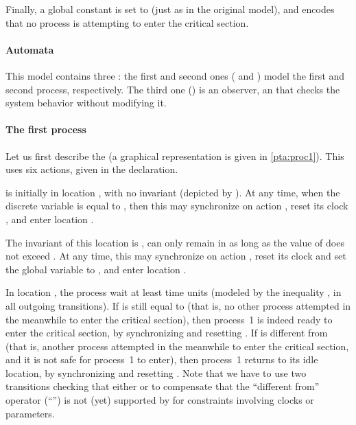 Finally, a global constant  is set to  (just as in the original \pat{} model), and encodes that no process is attempting to enter the critical section.





\paragraph{Automata}
This model contains three \IPTA{}:
the first and second ones ( and ) model the first and second process, respectively. The third one () is an observer, \ie{} an \IPTA{} that checks the system behavior without modifying it.

\paragraph{The first process}
Let us first describe the \IPTA{}  (a graphical representation is given in \cref{pta:proc1}).
This \IPTA{} uses six actions, given in the  declaration.

 is initially in location , with no invariant (depicted by ).
At any time, when the discrete variable  is equal to , then this \IPTA{} may synchronize on action , reset its clock , and enter location .

The invariant of this location is , \ie{}  can only remain in  as long as the value of  does not exceed .
At any time, this \IPTA{} may synchronize on action , reset its clock  and set the global variable  to , and enter location .

In location , the process wait at least  time units (modeled by the inequality , in all outgoing transitions).
If  is still equal to  (that is, no other process attempted in the meanwhile to enter the critical section), then process~1 is indeed ready to enter the critical section, by synchronizing  and resetting .
If  is different from  (that is, another process attempted in the meanwhile to enter the critical section, and it is not safe for process~1 to enter), then process~1 returns to its idle location, by synchronizing  and resetting .
Note that we have to use two transitions checking that either  or  to compensate that the ``different from'' operator (``\styleIMI{$\neq$}'') is not (yet) supported by \imitator{} for constraints involving clocks or parameters.

